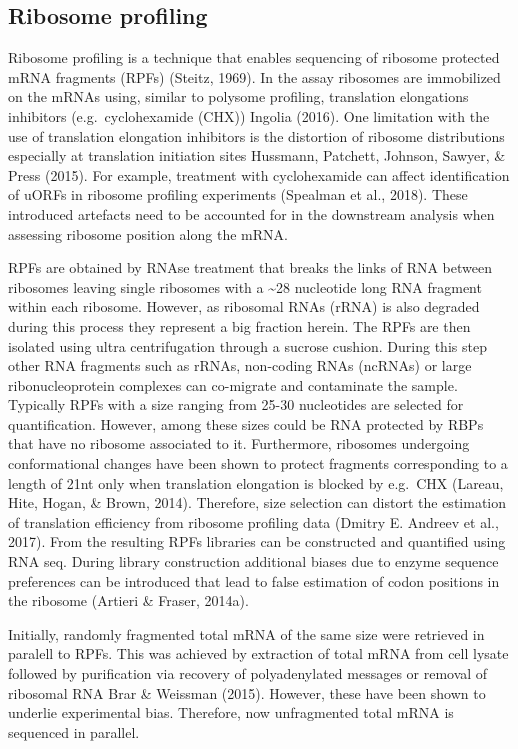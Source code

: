 \documentclass[
  12pt,
  openany]{book}
\begin{document}
\subsection{Ribosome profiling} \label{riboseq}

Ribosome profiling is a technique that enables sequencing of ribosome protected mRNA fragments (RPFs) (Steitz, 1969). In the assay ribosomes are immobilized on the mRNAs using, similar to polysome profiling, translation elongations inhibitors (e.g.~cyclohexamide (CHX)) Ingolia (2016). One limitation with the use of translation elongation inhibitors is the distortion of ribosome distributions especially at translation initiation sites Hussmann, Patchett, Johnson, Sawyer, \& Press (2015). For example, treatment with cyclohexamide can affect identification of uORFs in ribosome profiling experiments (Spealman et al., 2018). These introduced artefacts need to be accounted for in the downstream analysis when assessing ribosome position along the mRNA.

RPFs are obtained by RNAse treatment that breaks the links of RNA between ribosomes leaving single ribosomes with a \textasciitilde28 nucleotide long RNA fragment within each ribosome. However, as ribosomal RNAs (rRNA) is also degraded during this process they represent a big fraction herein. The RPFs are then isolated using ultra centrifugation through a sucrose cushion. During this step other RNA fragments such as rRNAs, non-coding RNAs (ncRNAs) or large ribonucleoprotein complexes can co-migrate and contaminate the sample. Typically RPFs with a size ranging from 25-30 nucleotides are selected for quantification. However, among these sizes could be RNA protected by RBPs that have no ribosome associated to it. Furthermore, ribosomes undergoing conformational changes have been shown to protect fragments corresponding to a length of 21nt only when translation elongation is blocked by e.g.~CHX (Lareau, Hite, Hogan, \& Brown, 2014). Therefore, size selection can distort the estimation of translation efficiency from ribosome profiling data (Dmitry E. Andreev et al., 2017). From the resulting RPFs libraries can be constructed and quantified using RNA seq. During library construction additional biases due to enzyme sequence preferences can be introduced that lead to false estimation of codon positions in the ribosome (Artieri \& Fraser, 2014a).

Initially, randomly fragmented total mRNA of the same size were retrieved in paralell to RPFs. This was achieved by extraction of total mRNA from cell lysate followed by purification via recovery of polyadenylated messages or removal of ribosomal RNA Brar \& Weissman (2015). However, these have been shown to underlie experimental bias. Therefore, now unfragmented total mRNA is sequenced in parallel.
\end{document}
